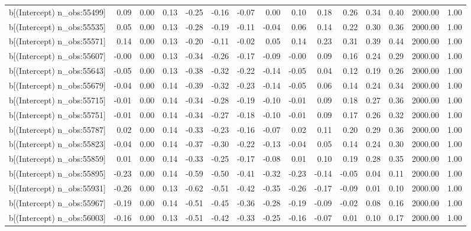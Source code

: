 \begin{table}[ht]
\begin{tabular}{rrrrrrrrrrrrrrr}
  b[(Intercept) n\_obs:55499] & 0.09 & 0.00 & 0.13 & -0.25 & -0.16 & -0.07 & 0.00 & 0.10 & 0.18 & 0.26 & 0.34 & 0.40 & 2000.00 & 1.00 \\ 
  b[(Intercept) n\_obs:55535] & 0.05 & 0.00 & 0.13 & -0.28 & -0.19 & -0.11 & -0.04 & 0.06 & 0.14 & 0.22 & 0.30 & 0.36 & 2000.00 & 1.00 \\ 
  b[(Intercept) n\_obs:55571] & 0.14 & 0.00 & 0.13 & -0.20 & -0.11 & -0.02 & 0.05 & 0.14 & 0.23 & 0.31 & 0.39 & 0.44 & 2000.00 & 1.00 \\ 
  b[(Intercept) n\_obs:55607] & -0.00 & 0.00 & 0.13 & -0.34 & -0.26 & -0.17 & -0.09 & -0.00 & 0.09 & 0.16 & 0.24 & 0.29 & 2000.00 & 1.00 \\ 
  b[(Intercept) n\_obs:55643] & -0.05 & 0.00 & 0.13 & -0.38 & -0.32 & -0.22 & -0.14 & -0.05 & 0.04 & 0.12 & 0.19 & 0.26 & 2000.00 & 1.00 \\ 
  b[(Intercept) n\_obs:55679] & -0.04 & 0.00 & 0.14 & -0.39 & -0.32 & -0.23 & -0.14 & -0.05 & 0.06 & 0.14 & 0.24 & 0.34 & 2000.00 & 1.00 \\ 
  b[(Intercept) n\_obs:55715] & -0.01 & 0.00 & 0.14 & -0.34 & -0.28 & -0.19 & -0.10 & -0.01 & 0.09 & 0.18 & 0.27 & 0.36 & 2000.00 & 1.00 \\ 
  b[(Intercept) n\_obs:55751] & -0.01 & 0.00 & 0.14 & -0.34 & -0.27 & -0.18 & -0.10 & -0.01 & 0.09 & 0.17 & 0.26 & 0.32 & 2000.00 & 1.00 \\ 
  b[(Intercept) n\_obs:55787] & 0.02 & 0.00 & 0.14 & -0.33 & -0.23 & -0.16 & -0.07 & 0.02 & 0.11 & 0.20 & 0.29 & 0.36 & 2000.00 & 1.00 \\ 
  b[(Intercept) n\_obs:55823] & -0.04 & 0.00 & 0.14 & -0.37 & -0.30 & -0.22 & -0.13 & -0.04 & 0.05 & 0.14 & 0.24 & 0.30 & 2000.00 & 1.00 \\ 
  b[(Intercept) n\_obs:55859] & 0.01 & 0.00 & 0.14 & -0.33 & -0.25 & -0.17 & -0.08 & 0.01 & 0.10 & 0.19 & 0.28 & 0.35 & 2000.00 & 1.00 \\ 
  b[(Intercept) n\_obs:55895] & -0.23 & 0.00 & 0.14 & -0.59 & -0.50 & -0.41 & -0.32 & -0.23 & -0.14 & -0.05 & 0.04 & 0.11 & 2000.00 & 1.00 \\ 
  b[(Intercept) n\_obs:55931] & -0.26 & 0.00 & 0.13 & -0.62 & -0.51 & -0.42 & -0.35 & -0.26 & -0.17 & -0.09 & 0.01 & 0.10 & 2000.00 & 1.00 \\ 
  b[(Intercept) n\_obs:55967] & -0.19 & 0.00 & 0.14 & -0.51 & -0.45 & -0.36 & -0.28 & -0.19 & -0.09 & -0.02 & 0.08 & 0.16 & 2000.00 & 1.00 \\ 
  b[(Intercept) n\_obs:56003] & -0.16 & 0.00 & 0.13 & -0.51 & -0.42 & -0.33 & -0.25 & -0.16 & -0.07 & 0.01 & 0.10 & 0.17 & 2000.00 & 1.00 \\ 

\end{tabular}
\end{table}
